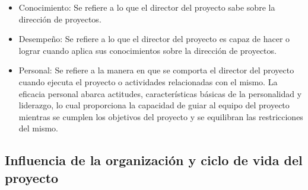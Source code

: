 \begin{itemize}

\item{Conocimiento: Se refiere a lo que el director del proyecto sabe sobre la dirección de proyectos.}

\item{Desempeño: Se refiere a lo que el director del proyecto es capaz de hacer o lograr cuando aplica sus 
conocimientos sobre la dirección de proyectos.}

\item{Personal: Se  refiere  a  la  manera  en  que  se  comporta  el  director  del  proyecto  cuando  ejecuta  
el  proyecto  o  actividades  relacionadas  con  el  mismo.  La  eficacia  personal  abarca  actitudes,  
características básicas de la personalidad y liderazgo, lo cual proporciona la capacidad de guiar al 
equipo del proyecto mientras se cumplen los objetivos del proyecto y se equilibran las restricciones 
del mismo.}

\end{itemize}

\newpage{}
\subsection{Influencia de la organización y ciclo de vida del proyecto}
